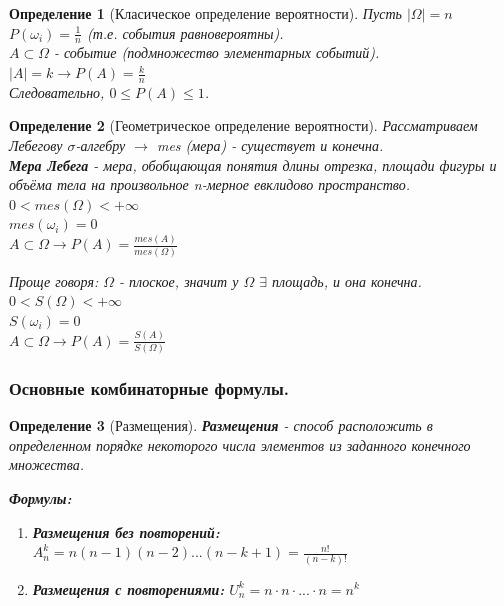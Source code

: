 \documentclass[14pt]{extarticle}
\theoremstyle{breakstyle}
\newtheorem{definition}{Определение}[subsection]
\begin{document}
\begin{definition}[Класическое определение вероятности]

Пусть $\mid \Omega \mid = n$
$P(\omega_i) = \frac{1}{n}$ (т.е. события равновероятны). \\
$A \subset \Omega$ - событие (подмножество элементарных событий). \\
$\mid A \mid = k \rightarrow P(A) = \frac{k}{n}$ \\
Следовательно, $0 \leq P(A) \leq 1$.

\end{definition}

\begin{definition}[Геометрическое определение вероятности]

Рассматриваем Лебегову $\sigma$-алгебру $\rightarrow$ mes (мера) - существует и конечна. \\
\textbf{Мера Лебега} - мера, обобщающая понятия длины отрезка, площади фигуры и объёма тела на произвольное n-мерное евклидово пространство. \\

$0 < mes(\Omega) < +\infty$ \\
$mes(\omega_i) = 0$ \\
$A \subset \Omega \rightarrow P(A) = \frac{mes(A)}{mes(\Omega)}$

\vspace{1em}
Проще говоря:
$\Omega$ - плоское, значит у $\Omega$ $\exists$ площадь, и она конечна. \\
$0 < S(\Omega) < +\infty$ \\
$S(\omega_i) = 0$\\
$A \subset \Omega \rightarrow P(A) = \frac{S(A)}{S(\Omega)}$ \\

\end{definition}

\subsubsection{Основные комбинаторные формулы.}
\begin{definition}[Размещения]
\textbf{Размещения} - способ расположить в определенном порядке некоторого числа элементов из заданного конечного множества.

\vspace{1em}

\textbf{Формулы:}
\begin{enumerate}[noitemsep, topsep=0pt]
    \item \textbf{Размещения без повторений:} $A_{n}^{k} = n(n-1)(n-2)...(n-k+1) = \frac{n!}{(n - k)!}$
    \item \textbf{Размещения с повторениями:} $U_{n}^{k} = n \cdot n \cdot ... \cdot n = {n}^{k}$
\end{enumerate}    

\end{definition}
\end{document}

